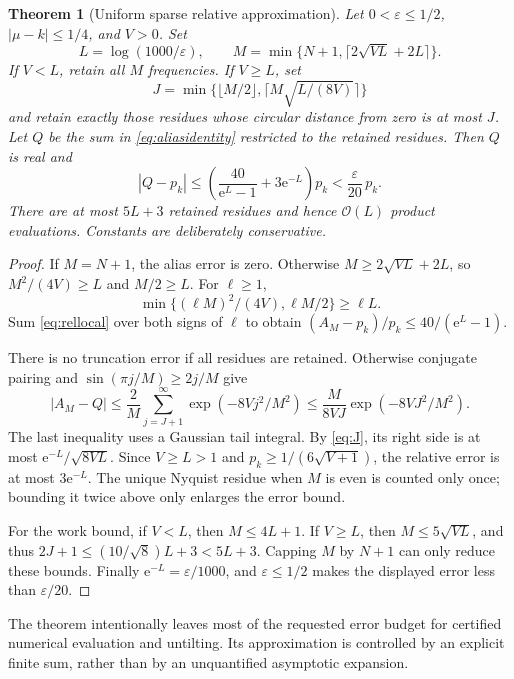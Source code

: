 \documentclass[11pt,a4paper]{article}
\newtheorem{theorem}{Theorem}[section]
\theoremstyle{definition}
\newcommand{\ee}{\mathrm e}
\newcommand{\abs}[1]{\left|#1\right|}
\newcommand{\BigO}{\mathcal O}
\begin{document}
\begin{theorem}[Uniform sparse relative approximation]\label{thm:sparse}
Let $0<\varepsilon\le1/2$, $\abs{\mu-k}\le1/4$, and $V>0$. Set
\begin{equation}\label{eq:grid}
 L=\log(1000/\varepsilon),\qquad
 M=\min\{N+1,\lceil2\sqrt{VL}+2L\rceil\}.
\end{equation}
If $V<L$, retain all $M$ frequencies. If $V\ge L$, set
\begin{equation}\label{eq:J}
 J=\min\{\lfloor M/2\rfloor,\lceil M\sqrt{L/(8V)}\rceil\}
\end{equation}
and retain exactly those residues whose circular distance from zero is at most $J$. Let $Q$ be the sum in \eqref{eq:aliasidentity} restricted to the retained residues. Then $Q$ is real and
\begin{equation}\label{eq:sparseerror}
 \abs{Q-p_k}\le
 \left(\frac{40}{\ee^L-1}+3\ee^{-L}\right)p_k
 <\frac{\varepsilon}{20}\,p_k.
\end{equation}
There are at most $5L+3$ retained residues and hence $\BigO(L)$ product evaluations. Constants are deliberately conservative.
\end{theorem}
\begin{proof}
If $M=N+1$, the alias error is zero. Otherwise $M\ge2\sqrt{VL}+2L$, so
$M^2/(4V)\ge L$ and $M/2\ge L$. For $\ell\ge1$,
\[
 \min\{(\ell M)^2/(4V),\ell M/2\}\ge\ell L.
\]
Sum \eqref{eq:rellocal} over both signs of $\ell$ to obtain
$(A_M-p_k)/p_k\le40/(\ee^L-1)$.

There is no truncation error if all residues are retained. Otherwise conjugate pairing and $\sin(\pi j/M)\ge2j/M$ give
\[
 \abs{A_M-Q}\le\frac2M\sum_{j=J+1}^{\infty}
 \exp(-8Vj^2/M^2)
 \le\frac{M}{8VJ}\exp(-8VJ^2/M^2).
\]
The last inequality uses a Gaussian tail integral. By \eqref{eq:J}, its right side is at most $\ee^{-L}/\sqrt{8VL}$. Since $V\ge L>1$ and $p_k\ge1/(6\sqrt{V+1})$, the relative error is at most $3\ee^{-L}$. The unique Nyquist residue when $M$ is even is counted only once; bounding it twice above only enlarges the error bound.

For the work bound, if $V<L$, then $M\le4L+1$. If $V\ge L$, then $M\le5\sqrt{VL}$, and thus
$2J+1\le (10/\sqrt8)L+3<5L+3$. Capping $M$ by $N+1$ can only reduce these bounds. Finally $\ee^{-L}=\varepsilon/1000$, and $\varepsilon\le1/2$ makes the displayed error less than $\varepsilon/20$.
\end{proof}

The theorem intentionally leaves most of the requested error budget for certified numerical evaluation and untilting. Its approximation is controlled by an explicit finite sum, rather than by an unquantified asymptotic expansion.
\end{document}
